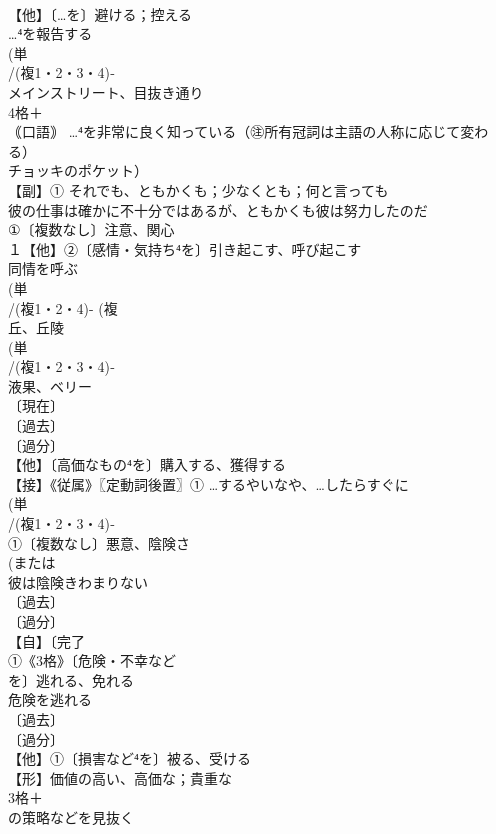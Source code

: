 \documentclass[8pt]{extreport}
\begin{document}
\begin{CJK}{UTF8}{min}
\\	【他】〔…を〕避ける；控える 
\\	…⁴を報告する
\\	(単
\\	/(複1・2・3・4)‐
\\	メインストリート、目抜き通り 
\\	4格＋
\\	｟口語｠ …⁴を非常に良く知っている（㊟所有冠詞は主語の人称に応じて変わる） 
\\	チョッキのポケット）
\\	【副】① それでも、ともかくも；少なくとも；何と言っても 
\\	彼の仕事は確かに不十分ではあるが、ともかくも彼は努力したのだ
\\	①〔複数なし〕注意、関心 
\\	１【他】②〔感情・気持ち⁴を〕引き起こす、呼び起こす 
\\	同情を呼ぶ 
\\	(単
\\	/(複1・2・4)- (複
\\	丘、丘陵 
\\	(単
\\	/(複1・2・3・4)‐
\\	液果、ベリー 
\\	〔現在〕
\\	〔過去〕
\\	〔過分〕
\\	【他】〔高価なもの⁴を〕購入する、獲得する 
\\	【接】《従属》〖定動詞後置〗① …するやいなや、…したらすぐに 
\\	(単
\\	/(複1・2・3・4)‐
\\	①〔複数なし〕悪意、陰険さ 
\\	(または
\\	彼は陰険きわまりない
\\	〔過去〕
\\	〔過分〕
\\	【自】〔完了
\\	①《3格》〔危険・不幸など
\\	を〕逃れる、免れる 
\\	危険を逃れる
\\	〔過去〕
\\	〔過分〕
\\	【他】①〔損害など⁴を〕被る、受ける 
\\	【形】価値の高い、高価な；貴重な 
\\	3格＋
\\	の策略などを見抜く 

\end{CJK}
\end{document}
